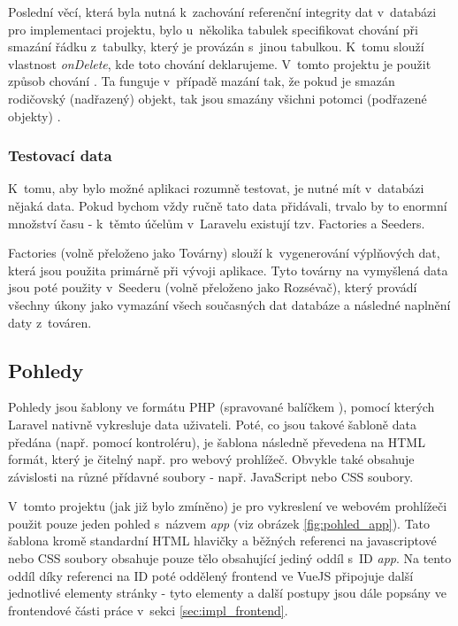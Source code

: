 	Poslední věcí, která byla nutná k~zachování referenční integrity dat v~databázi pro implementaci projektu, bylo u~několika tabulek specifikovat chování při smazání řádku z~tabulky, který je provázán s~jinou tabulkou. K~tomu slouží vlastnost \textit{onDelete}, kde toto chování deklarujeme. V~tomto projektu je použit způsob chování . Ta funguje v~případě mazání tak, že pokud je smazán rodičovský (nadřazený) objekt, tak jsou smazány všichni potomci (podřazené objekty) \cite{CascadeDel}.
		
		\subsubsection{Testovací data}
		K~tomu, aby bylo možné aplikaci rozumně testovat, je nutné mít v~databázi nějaká data. Pokud bychom vždy ručně tato data přidávali, trvalo by to enormní množství času - k~těmto účelům v~Laravelu existují tzv. Factories a Seeders.
		
		Factories (volně přeloženo jako Továrny) slouží k~vygenerování výplňových dat, která jsou použita primárně při vývoji aplikace. Tyto továrny na vymyšlená data jsou poté použity v~Seederu (volně přeloženo jako Rozsévač), který provádí všechny úkony jako vymazání všech současných dat databáze a následné naplnění daty z~továren.
	
	\subsection{Pohledy}\label{sec:be_pohledy}
	Pohledy jsou šablony ve formátu PHP (spravované balíčkem ), pomocí kterých Laravel nativně vykresluje data uživateli. Poté, co jsou takové šabloně data předána (např. pomocí kontroléru), je šablona následně převedena na HTML formát, který je čitelný např. pro webový prohlížeč. Obvykle také obsahuje závislosti na různé přídavné soubory - např. JavaScript nebo CSS soubory. 
	
	V~tomto projektu (jak již bylo zmíněno) je pro vykreslení ve webovém prohlížeči použit pouze jeden pohled s~názvem \textit{app} (viz obrázek \ref{fig:pohled_app}). Tato šablona kromě standardní HTML hlavičky a běžných referenci na javascriptové nebo CSS soubory obsahuje pouze tělo obsahující jediný oddíl s~ID \textit{app}. Na tento oddíl díky referenci na ID poté oddělený frontend ve VueJS připojuje další jednotlivé elementy stránky - tyto elementy a další postupy jsou dále popsány ve frontendové části práce v~sekci \ref{sec:impl_frontend}.
	
